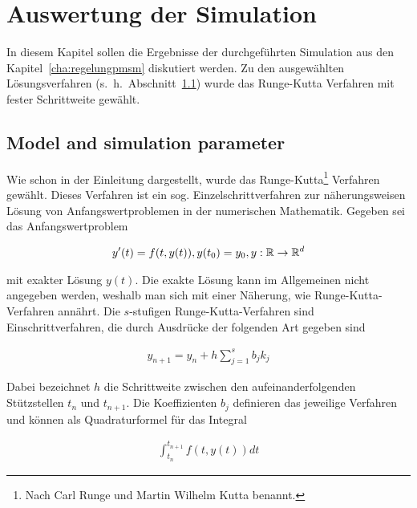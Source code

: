 
\chapter{Auswertung der Simulation}
\label{chap:ergebnisse-foc}

In diesem Kapitel sollen die Ergebnisse der durchgeführten Simulation aus den Kapitel~\ref{cha:regelungpmsm} diskutiert werden.
Zu den ausgewählten Lösungsverfahren (s.~h.~Abschnitt~\ref{sec:parameter}) wurde das Runge-Kutta Verfahren mit fester Schrittweite gewählt.

\section{Model and simulation parameter}\label{sec:parameter}

Wie schon in der Einleitung dargestellt, wurde das Runge-Kutta\footnote{Nach Carl Runge und Martin Wilhelm Kutta benannt.} Verfahren gewählt.
Dieses Verfahren ist ein sog. Einzelschrittverfahren zur näherungsweisen Lösung von Anfangswertproblemen in der numerischen Mathematik.
Gegeben sei das Anfangswertproblem

\begin{align}
	y'(t) = f(t,y(t)), y(t_{\mathrm{0}})=y_{\mathrm{0}}, y: \mathbb{R}\rightarrow\mathbb{R}^{d}
\end{align}

mit exakter Lösung $y(t)$.
Die exakte Lösung kann im Allgemeinen nicht angegeben werden, weshalb man sich mit einer Näherung, wie Runge-Kutta-Verfahren annährt.
Die $s$-stufigen Runge-Kutta-Verfahren sind Einschrittverfahren, die durch Ausdrücke der folgenden Art gegeben sind

\begin{align}
	y_{n+1} = y_n + h \sum_{j=1}^{s}{b_j k_j}
\end{align}

Dabei bezeichnet $h$ die Schrittweite zwischen den aufeinanderfolgenden Stützstellen $t_n$ und $t_{n+1}$.
Die Koeffizienten $b_j$ definieren das jeweilige Verfahren und können als Quadraturformel für das Integral

\begin{align}
	\int_{t_n}^{t_{n+1}}{f(t,y(t))dt}
\end{align}

